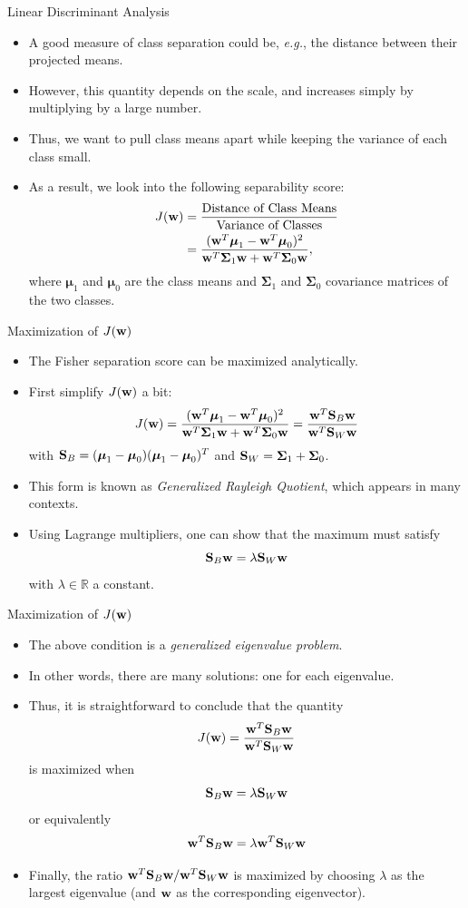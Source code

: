 \documentclass[10pt, aspectratio=169]{beamer} %
\newcommand{\R}{{\mathbb{R}}}
\newcommand{\w}{{\bf w}}
\newcommand{\Sigb}{\boldsymbol{\Sigma}}
\newcommand{\mub}{\boldsymbol{\mu}}
\newcommand{\SB}{{\bf S}}
\begin{document}
\begin{frame}{Linear Discriminant Analysis}
\begin{itemize}
\item A good measure of class separation could be,\textit{ e.g.}, the distance between their projected means.
\item However, this quantity depends on the scale, and increases simply by multiplying by a large number.
\item Thus, we want to pull class means apart while keeping the variance of each class small.
\item As a result, we look into the following separability score:
\begin{align*}
J(\w) &= \frac{\text{Distance of Class Means}}{\text{Variance of Classes}}\\
&= \frac{(\w^T\mub_1 - \w^T\mub_0)^2}{\w^T\Sigb_1\w + \w^T\Sigb_0\w},
\end{align*}
where $\mub_1$ and $\mub_0$ are the class means and $\Sigb_1$ and $\Sigb_0$ covariance matrices of the
two classes.
\end{itemize}
\end{frame}

\begin{frame}{Maximization of $J(\w)$}
\begin{itemize}
\item The Fisher separation score can be maximized analytically.
\item First simplify $J(\w)$ a bit:
\[
J(\w) = \frac{(\w^T\mub_1 - \w^T\mub_0)^2}{\w^T\Sigb_1\w + \w^T\Sigb_0\w} = \frac{\w^T\SB_B\w}{\w^T\SB_W\w}
\]
with $\SB_B = (\mub_1 - \mub_0)(\mub_1 - \mub_0)^T$ and $\SB_W = \Sigb_1 + \Sigb_0$.
\item This form is known as \textit{Generalized Rayleigh Quotient}, which appears in many contexts.
\item Using Lagrange multipliers, one can show that the maximum must satisfy
\[
\SB_B\w = \lambda \SB_W\w
\]
with $\lambda \in \R$ a constant. 
\end{itemize}
\end{frame}

\begin{frame}{Maximization of $J(\w)$}
\begin{itemize}
\item The above condition is a \textit{generalized eigenvalue problem}.
\item In other words, there are many solutions: one for each eigenvalue.
\item Thus, it is straightforward to conclude that the quantity
\[
J(\w) = \frac{\w^T\SB_B\w}{\w^T\SB_W\w}
\]
is maximized when
\[
\SB_B\w = \lambda \SB_W\w
\]
or equivalently
\[
\w^T\SB_B\w = \lambda \w^T\SB_W\w
\]
\item Finally, the ratio $\w^T\SB_B\w  / \w^T\SB_W\w$ is maximized by choosing
$\lambda$ as the largest eigenvalue (and $\w$ as the corresponding eigenvector).
\end{itemize}
\end{frame}
\end{document}
